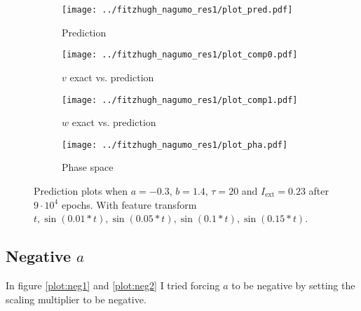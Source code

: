 \documentclass[a4paper]{article}
\begin{document}
\begin{figure}[H]
	\centering 
	\begin{subfigure}[b]{0.47\textwidth}
		\centering
		\texttt{[image: ../fitzhugh\_nagumo\_res1/plot\_pred.pdf]}
		\caption{Prediction}
		\label{fig:all11a}
	\end{subfigure}
	\begin{subfigure}[b]{0.47\textwidth}
		\centering
		\texttt{[image: ../fitzhugh\_nagumo\_res1/plot\_comp0.pdf]}
		\caption{$v$ exact vs. prediction}
		\label{fig:all11b}
	\end{subfigure}
	\begin{subfigure}[b]{0.47\textwidth}
		\centering
		\texttt{[image: ../fitzhugh\_nagumo\_res1/plot\_comp1.pdf]}
		\caption{$w$ exact vs. prediction}
		\label{fig:all11c}
	\end{subfigure}
	\begin{subfigure}[b]{0.47\textwidth}
		\centering
		\texttt{[image: ../fitzhugh\_nagumo\_res1/plot\_pha.pdf]}
		\caption{Phase space}
		\label{fig:all11d}
	\end{subfigure}
	\caption{Prediction plots when $a=-0.3$, $b=1.4$, $\tau=20$ and $ I_{\text{ext}}=0.23$ after $9\cdot10^4$ epochs. With feature transform $t, \sin(0.01 * t), \sin(0.05 * t), \sin(0.1 * t), \sin(0.15 * t)$.}
	\label{plot:all11}
\end{figure}


\subsection{Negative $a$}

In figure \ref{plot:neg1} and \ref{plot:neg2} I tried forcing $a$ to be negative by setting the scaling multiplier to be negative.
\end{document}
